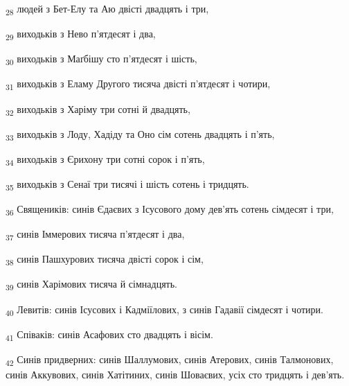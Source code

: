 \begin{tcolorbox}
\textsubscript{28} людей з Бет-Елу та Аю двісті двадцять і три,
\end{tcolorbox}
\begin{tcolorbox}
\textsubscript{29} виходьків з Нево п'ятдесят і два,
\end{tcolorbox}
\begin{tcolorbox}
\textsubscript{30} виходьків з Маґбішу сто п'ятдесят і шість,
\end{tcolorbox}
\begin{tcolorbox}
\textsubscript{31} виходьків з Еламу Другого тисяча двісті п'ятдесят і чотири,
\end{tcolorbox}
\begin{tcolorbox}
\textsubscript{32} виходьків з Харіму три сотні й двадцять,
\end{tcolorbox}
\begin{tcolorbox}
\textsubscript{33} виходьків з Лоду, Хадіду та Оно сім сотень двадцять і п'ять,
\end{tcolorbox}
\begin{tcolorbox}
\textsubscript{34} виходьків з Єрихону три сотні сорок і п'ять,
\end{tcolorbox}
\begin{tcolorbox}
\textsubscript{35} виходьків з Сенаї три тисячі і шість сотень і тридцять.
\end{tcolorbox}
\begin{tcolorbox}
\textsubscript{36} Священиків: синів Єдаєвих з Ісусового дому дев'ять сотень сімдесят і три,
\end{tcolorbox}
\begin{tcolorbox}
\textsubscript{37} синів Іммерових тисяча п'ятдесят і два,
\end{tcolorbox}
\begin{tcolorbox}
\textsubscript{38} синів Пашхурових тисяча двісті сорок і сім,
\end{tcolorbox}
\begin{tcolorbox}
\textsubscript{39} синів Харімових тисяча й сімнадцять.
\end{tcolorbox}
\begin{tcolorbox}
\textsubscript{40} Левитів: синів Ісусових і Кадміїлових, з синів Гадавії сімдесят і чотири.
\end{tcolorbox}
\begin{tcolorbox}
\textsubscript{41} Співаків: синів Асафових сто двадцять і вісім.
\end{tcolorbox}
\begin{tcolorbox}
\textsubscript{42} Синів придверних: синів Шаллумових, синів Атерових, синів Талмонових, синів Аккувових, синів Хатітиних, синів Шоваєвих, усіх сто тридцять і дев'ять.
\end{tcolorbox}
